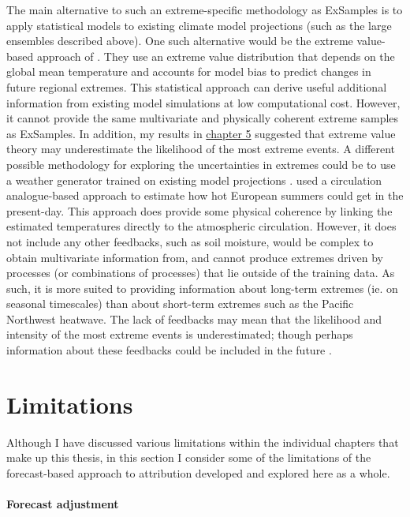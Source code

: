     The main alternative to such an extreme-specific methodology as ExSamples is to apply statistical models to existing climate model projections (such as the large ensembles described above). One such alternative would be the extreme value-based approach of \citet{brown_climate_2014}. They use an extreme value distribution that depends on the global mean temperature and accounts for model bias to predict changes in future regional extremes. This statistical approach can derive useful additional information from existing model simulations at low computational cost. However, it cannot provide the same multivariate and physically coherent extreme samples as ExSamples. In addition, my results in \hyperref[ch5]{chapter 5} suggested that extreme value theory may underestimate the likelihood of the most extreme events. A different possible methodology for exploring the uncertainties in extremes could be to use a weather generator trained on existing model projections \citep{yiou_anawege_2014}. \citet{yiou_simulation_2020} used a circulation analogue-based approach to estimate how hot European summers could get in the present-day. This approach does provide some physical coherence by linking the estimated temperatures directly to the atmospheric circulation. However, it does not include any other feedbacks, such as soil moisture, would be complex to obtain multivariate information from, and cannot produce extremes driven by processes (or combinations of processes) that lie outside of the training data. As such, it is more suited to providing information about long-term extremes (ie. on seasonal timescales) than about short-term extremes such as the Pacific Northwest heatwave. The lack of feedbacks may mean that the likelihood and intensity of the most extreme events is underestimated; though perhaps information about these feedbacks could be included in the future \citep{suarez-gutierrez_dynamical_2020}. 

\section{Limitations}\label{discussion:limitations}

  Although I have discussed various limitations within the individual chapters that make up this thesis, in this section I consider some of the limitations of the forecast-based approach to attribution developed and explored here as a whole.

  \paragraph*{Forecast adjustment}

